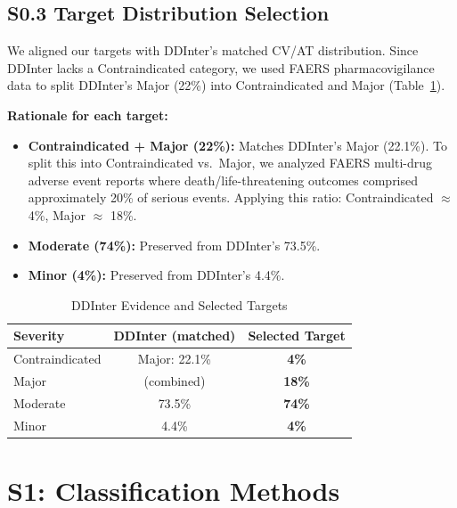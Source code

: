 \documentclass[11pt,a4paper]{article}
\begin{document}
\subsection{S0.3 Target Distribution Selection}

We aligned our targets with DDInter's matched CV/AT distribution. Since DDInter lacks a Contraindicated category, we used FAERS pharmacovigilance data to split DDInter's Major (22\%) into Contraindicated and Major (Table~\ref{tab:consensus}).

\textbf{Rationale for each target:}
\begin{itemize}
\item \textbf{Contraindicated + Major (22\%):} Matches DDInter's Major (22.1\%). To split this into Contraindicated vs.\ Major, we analyzed FAERS multi-drug adverse event reports where death/life-threatening outcomes comprised approximately 20\% of serious events. Applying this ratio: Contraindicated $\approx$ 4\%, Major $\approx$ 18\%.
\item \textbf{Moderate (74\%):} Preserved from DDInter's 73.5\%.
\item \textbf{Minor (4\%):} Preserved from DDInter's 4.4\%.
\end{itemize}

\begin{table}[h]
\centering
\small
\caption{DDInter Evidence and Selected Targets}
\label{tab:consensus}
\begin{tabular}{@{}lcc@{}}
\toprule
\textbf{Severity} & \textbf{DDInter (matched)} & \textbf{Selected Target} \\
\midrule
Contraindicated & Major: 22.1\% & \textbf{4\%} \\
Major & (combined) & \textbf{18\%} \\
Moderate & 73.5\% & \textbf{74\%} \\
Minor & 4.4\% & \textbf{4\%} \\
\bottomrule
\end{tabular}
\end{table}

\newpage

\section{S1: Classification Methods}
\end{document}
